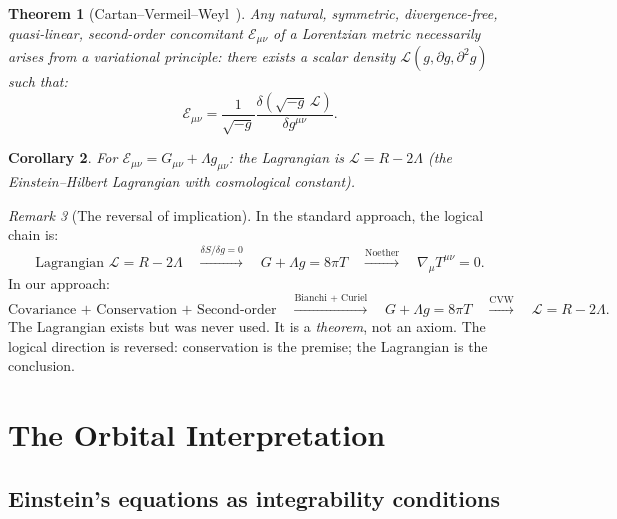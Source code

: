 \documentclass[12pt]{article}
\theoremstyle{plain}
\newtheorem{theorem}{Theorem}[section]
\newtheorem{corollary}[theorem]{Corollary}
\theoremstyle{definition}
\theoremstyle{remark}
\newtheorem{remark}[theorem]{Remark}
\begin{document}
\begin{theorem}[Cartan--Vermeil--Weyl~\cite{vermeil1917,cartan1922,weyl1922}]\label{thm:CVW}
Any natural, symmetric, divergence-free, quasi-linear, second-order concomitant $\mathcal{E}_{\mu\nu}$ of a Lorentzian metric necessarily arises from a variational principle: there exists a scalar density $\mathcal{L}(g, \partial g, \partial^2 g)$ such that:
\begin{equation}
\mathcal{E}_{\mu\nu} = \frac{1}{\sqrt{-g}}\frac{\delta(\sqrt{-g}\,\mathcal{L})}{\delta g^{\mu\nu}}.
\end{equation}
\end{theorem}

\begin{corollary}\label{cor:EH}
For $\mathcal{E}_{\mu\nu} = G_{\mu\nu} + \Lambda g_{\mu\nu}$: the Lagrangian is $\mathcal{L} = R - 2\Lambda$ (the Einstein--Hilbert Lagrangian with cosmological constant).
\end{corollary}

\begin{remark}[The reversal of implication]\label{rmk:reversal}
In the standard approach, the logical chain is:
$$\text{Lagrangian } \mathcal{L} = R - 2\Lambda \quad\xrightarrow{\delta S/\delta g = 0}\quad G + \Lambda g = 8\pi T \quad\xrightarrow{\text{Noether}}\quad \nabla_\mu T^{\mu\nu} = 0.$$
In our approach:
$$\text{Covariance + Conservation + Second-order} \quad\xrightarrow{\text{Bianchi + Curiel}}\quad G + \Lambda g = 8\pi T \quad\xrightarrow{\text{CVW}}\quad \mathcal{L} = R - 2\Lambda.$$
The Lagrangian exists but was never used. It is a \emph{theorem}, not an axiom. The logical direction is reversed: conservation is the premise; the Lagrangian is the conclusion.
\end{remark}


\section{The Orbital Interpretation}
\label{sec:orbital}

\subsection{Einstein's equations as integrability conditions}
\end{document}

